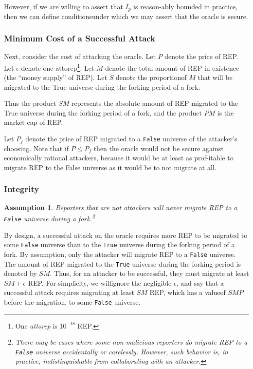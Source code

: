 \documentclass[12pt,floatfix,reprint,nofootinbib,amsmath,amssymb,epsfig,pre,floats,letterpaper,groupedaffiliation]{revtex4-1}
\newtheorem{assumption}{Assumption}
\theoremstyle{definition}
\theoremstyle{definition}
\begin{document}
However, if we are willing to assert that $I_p$ is reason-\linebreak ably bounded in practice, then we can define conditions\linebreak under which we may assert that the oracle is secure.

\subsubsection{Minimum Cost of a Successful Attack}

Next, consider the cost of attacking the oracle. Let $P$ denote the price of REP. Let $\epsilon$ denote one attorep\footnote{One \textit{attorep} is $10^{-18}$ REP.}. Let $M$ denote the total amount of REP in existence (the ``money supply'' of REP). Let $S$ denote the proportion\linebreak of $M$ that will be migrated to the True universe during the forking period of a fork.

Thus the product $SM$ represents the absolute amount of REP migrated to the True universe during the forking period of a fork, and the product $PM$ is the market cap of REP.

Let $P_f$ denote the price of REP migrated to a \texttt{False} universe of the attacker's choosing. Note that if $P \leq P_f$ then the oracle would not be secure against economically rational attackers, because it would be at least as prof-\linebreak itable to migrate REP to the False universe as it would be to not migrate at all.

\subsubsection{Integrity}

\begin{assumption}
Reporters that are not attackers will never migrate REP to a \texttt{False} universe during a fork.\footnote{There may be cases where some non-malicious reporters do migrate REP to a \texttt{False} universe accidentally or carelessly. However, such behavior is, in practice, indistinguishable from collaborating with an attacker.}
\end{assumption}

By design, a successful attack on the oracle requires more REP to be migrated to some \texttt{False} universe than to the \texttt{True} universe during the forking period of a fork. By assumption, only the attacker will migrate REP to a \texttt{False} universe. The amount of REP migrated to the \texttt{True} universe during the forking period is denoted by $SM$. Thus, for an attacker to be successful, they must migrate at least $SM + \epsilon$ REP. For simplicity, we will\linebreak ignore the negligible $\epsilon$, and say that a successful attack requires migrating at least $SM$ REP, which has a value\linebreak of $SMP$ before the migration, to some \texttt{False} universe.
\end{document}

